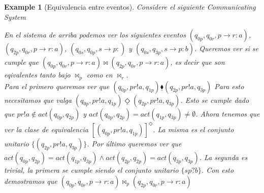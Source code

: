 \documentclass[paper=a4, fontsize=11pt, spanish]{scrartcl} %
\numberwithin{equation}{section} %
\numberwithin{figure}{section} %
\numberwithin{table}{section} %
\newtheorem{example}{Example}
\begin{document}
\begin{example}[Equivalencia entre eventos]
\label{ex:equiveventos}
Considere el siguiente Communicating System

\qquad
{} 
\qquad
{} 

En el sistema de arriba podemos ver los siguientes eventos $(q_{0p}, q_{0r}, p \rightarrow r:a)$, $(q_{2p}, q_{0r}, p \rightarrow r:a)$, $(q_{0s}, q_{0p}, s \rightarrow p:)$ y $(q_{0s}, q_{3p}, s \rightarrow p:b)$. Queremos ver si se cumple que $(q_{0p}, q_{0r}, p \rightarrow r:a) \bowtie (q_{2p}, q_{0r}, p \rightarrow r:a)$, es decir que son eqivalentes tanto bajo $\bowtie_p$ como en $\bowtie_r$. \\ 

Para el primero queremos ver que $(q_{0p}, pr!a, q_{1p}) \underline {\blacklozenge} (q_{2p}, pr!a, q_{3p})$
Para esto necesitamos que valga $(q_{0p}, pr!a, q_{1p}) \underline {\Diamond} (q_{2p}, pr!a, q_{3p})$. Esto se cumple dado que $pr!a \notin act(q_{0p},q_{2p})$ y $act(q_{0p},q_{2p}) = act(q_{1p},q_{3p}) \neq \emptyset$. Ahora tenemos que ver la clase de equivalencia $[(q_{0p}, pr!a, q_{1p})]^{\Diamond}$. La misma es el conjunto unitario $ \{(q_{2p}, pr!a, q_{3p})\}$. Por último queremos ver que  $act(q_{0p}, q_{2p}) = 
act(q_{1p}, q_{3p}) \land act(q_{2p}, q_{2p}) = act(q_{3p}, q_{3p})$. La segunda es trivial, la primera se cumple siendo el conjunto unitario $\{sp?b\}$. Con esto demostramos que $(q_{0p}, q_{0r}, p \rightarrow r:a) \bowtie_p (q_{2p}, q_{0r}, p \rightarrow r:a)$ \\


\end{example}
\end{document}
